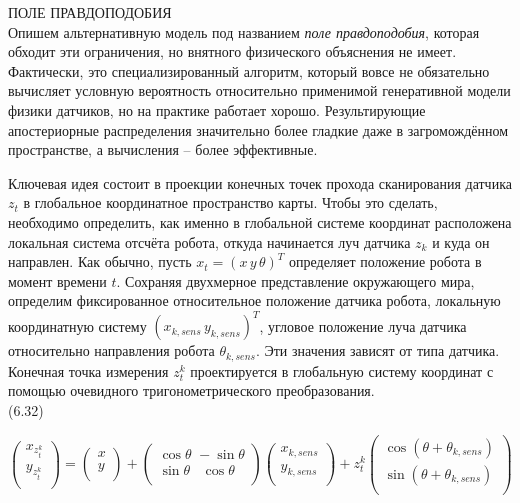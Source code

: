 \documentclass[10pt,a4paper]{article}
\begin{document}
ПОЛЕ ПРАВДОПОДОБИЯ\\
Опишем альтернативную модель под названием \textit{поле правдоподобия}, которая обходит эти ограничения, но внятного физического объяснения не имеет.
Фактически, это специализированный алгоритм, который вовсе не обязательно вычисляет условную вероятность относительно применимой генеративной модели физики датчиков, но на практике работает хорошо. Результирующие апостериорные распределения значительно более гладкие даже в загромождённом пространстве, а вычисления – более эффективные.

Ключевая идея состоит в проекции конечных точек прохода сканирования датчика $z_t$ в глобальное координатное пространство карты. Чтобы это сделать, необходимо определить, как именно в глобальной системе координат расположена локальная система отсчёта робота, откуда начинается луч датчика $z_k$ и куда он направлен. Как обычно, пусть $x_t = (x\,y\,\theta)^T$ определяет положение робота в момент времени $t$.
Сохраняя двухмерное представление окружающего мира, определим фиксированное относительное положение датчика робота, локальную координатную систему $(x_{k,sens}\, y_{k,sens})^T$, угловое положение луча датчика относительно направления робота $\theta_{k,sens}$. Эти значения зависят от типа датчика. Конечная точка измерения $z_t^k$ проектируется в глобальную систему координат с помощью очевидного тригонометрического преобразования.\\

(6.32)\\
 
\begin{minipage}{0.2\textwidth}
	\begin{equation*}
	\left(\begin{array}{c}
	x_{z_t^k}\\
	y_{z_t^k}\\
	\end{array}\right)
	=
	\left(\begin{array}{c}
	x\\
	y\\
	\end{array}\right)
	+
	\left(\begin{array}{c}
	\cos\theta\,\,-\sin\theta\\
	\sin\theta\,\,\,\,\,\cos\theta\\
	\end{array}\right)
	\left(\begin{array}{c}
	x_{k,sens}\\
	y_{k,sens}\\
	\end{array}\right)
	+z_t^k
	\left(\begin{array}{c}
	\cos(\theta+\theta_{k,sens})\\
	\sin(\theta+\theta_{k,sens})\\
	\end{array}\right)
	\end{equation*}
\end{minipage}\\
\end{document}
